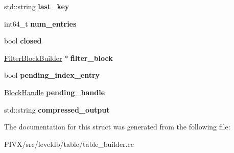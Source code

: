 \begin{DoxyCompactItemize}
std\+::string {\bfseries last\+\_\+key}
\item 
\mbox{\label{structleveldb_1_1_table_builder_1_1_rep_a89f93baffb3ca5c8239796dc1a57777a}} 
int64\+\_\+t {\bfseries num\+\_\+entries}
\item 
\mbox{\label{structleveldb_1_1_table_builder_1_1_rep_a5324550d58b999bcea173b1c21060138}} 
bool {\bfseries closed}
\item 
\mbox{\label{structleveldb_1_1_table_builder_1_1_rep_aad1620ca746b7287a819880be083ec6b}} 
\mbox{\hyperlink{classleveldb_1_1_filter_block_builder}{Filter\+Block\+Builder}} $\ast$ {\bfseries filter\+\_\+block}
\item 
\mbox{\label{structleveldb_1_1_table_builder_1_1_rep_a56e14221a2e29941a37d208f99770c20}} 
bool {\bfseries pending\+\_\+index\+\_\+entry}
\item 
\mbox{\label{structleveldb_1_1_table_builder_1_1_rep_abf3b47f6f2b7407399c7134ac65f7225}} 
\mbox{\hyperlink{classleveldb_1_1_block_handle}{Block\+Handle}} {\bfseries pending\+\_\+handle}
\item 
\mbox{\label{structleveldb_1_1_table_builder_1_1_rep_ae299e513afc71a8474c303b25aaadb08}} 
std\+::string {\bfseries compressed\+\_\+output}
\end{DoxyCompactItemize}


The documentation for this struct was generated from the following file\+:\begin{DoxyCompactItemize}
\item 
P\+I\+V\+X/src/leveldb/table/table\+\_\+builder.\+cc\end{DoxyCompactItemize}
